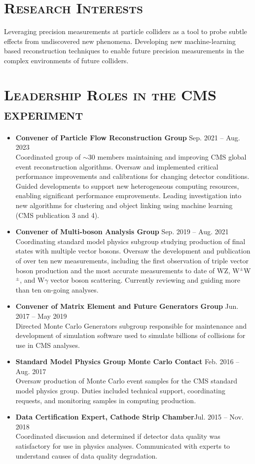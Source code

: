 \documentclass[10pt]{res} %
\begin{document}
\begin{resume}
\section{\textsc{Research Interests}}
Leveraging precision measurements at particle colliders as a tool to probe subtle effects from undiscovered new phenomena. 
Developing new machine-learning based reconstruction techniques to enable future precision measurements in the 
complex environments of future colliders.

\section{\textsc{Leadership Roles in the CMS experiment}}
\begin{itemize}
\item{\textbf{Convener of Particle Flow Reconstruction Group} \hfill{Sep. 2021 -- Aug. 2023}} \\
    Coordinated group of $\sim$30 members maintaining and improving CMS global event reconstruction algorithms.
    Oversaw and implemented critical performance improvements and calibrations for 
    changing detector conditions. Guided developments to support new heterogeneous computing resources,
    enabling significant performance emprovements.
    Leading investigation into new algorithms for clustering and object linking using machine learning (CMS publication 3 and 4).
\item{\textbf{Convener of Multi-boson Analysis Group} \hfill{Sep. 2019 -- Aug. 2021}} \\
    Coordinating standard model physics subgroup studying production of final states
    with multiple vector bosons. Oversaw the development and publication of over ten new measurements, 
    including the first observation of triple vector boson production and the most accurate measurements 
    to date of WZ, W$^{\pm}$W$^{\pm}$, and W$\gamma$ vector boson scattering. Currently reviewing and guiding
    more than ten on-going analyses.
\item{\textbf{Convener of Matrix Element and Future Generators Group} \hfill{Jun. 2017 -- May 2019}}\\
    Directed Monte Carlo Generators subgroup 
    responsible for maintenance and development of simulation software used to simulate
    billions of collisions for use in CMS analyses.
\item{\textbf{Standard Model Physics Group Monte Carlo Contact} \hfill{Feb. 2016 -- Aug. 2017}} \\
    Oversaw
    production of Monte Carlo event samples for the CMS standard model physics group. 
    Duties included technical support, coordinating requests, and monitoring samples in computing production.
\item{\textbf{ Data Certification Expert, Cathode Strip Chamber}\hfill{Jul. 2015 -- Nov. 2018}} \\
    Coordinated discussion and determined if
    detector data quality was satisfactory for use in physics analyses.
    Communicated with experts to understand
    causes of data quality degradation.
\end{itemize}


\end{resume}
\end{document}
